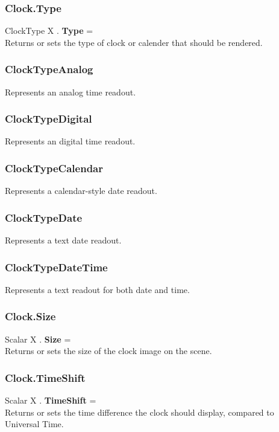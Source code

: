 \subsubsection{Clock.Type \label{F:Clock:Type}}
ClockType X . \textbf{Type} = \\
Returns or sets the type of clock or calender that should be rendered.

\subsubsection{ClockTypeAnalog \label{T:ClockType|ClockTypeAnalog}}
Represents an analog time readout.

\subsubsection{ClockTypeDigital \label{T:ClockType|ClockTypeDigital}}
Represents an digital time readout.

\subsubsection{ClockTypeCalendar \label{T:ClockType|ClockTypeCalendar}}
Represents a calendar-style date readout.

\subsubsection{ClockTypeDate \label{T:ClockType|ClockTypeDate}}
Represents a text date readout.

\subsubsection{ClockTypeDateTime \label{T:ClockType|ClockTypeDateTime}}
Represents a text readout for both date and time.

\subsubsection{Clock.Size \label{F:Clock:Size}}
Scalar X . \textbf{Size} = \\
Returns or sets the size of the clock image on the scene.

\subsubsection{Clock.TimeShift \label{F:Clock:TimeShift}}
Scalar X . \textbf{TimeShift} = \\
Returns or sets the time difference the clock should display, compared to Universal Time.

